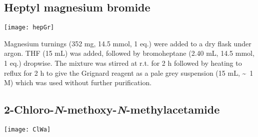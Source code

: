 {{{%
%
%

\subsection{Heptyl magnesium bromide }


\begin{scheme}[H]
	\begin{center}
		\texttt{[image: hepGr]}
	\end{center}
\end{scheme}

Magnesium turnings (352 mg, 14.5 mmol, 1 eq.) were added to a dry flask under argon. THF (15 mL) was added, followed by bromoheptane (2.40 mL, 14.5 mmol, 1 eq.) dropwise. The mixture was stirred at r.t. for 2 h followed by heating to reflux for 2 h to give the Grignard reagent as a pale grey suspension (15 mL, \textasciitilde ~1 M) which was used without further purification.

\subsection{2-Chloro-\textit{N}-methoxy-\textit{N}-methylacetamide }

\begin{scheme}[H]
	\begin{center}
		\texttt{[image: ClWa]}
	\end{center}
\end{scheme}


}}}
